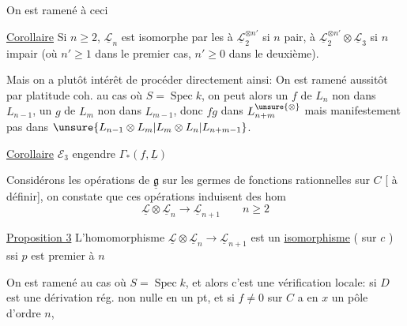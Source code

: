 On est ramené à ceci

\uline{Corollaire} Si $n\geq2$, $\underline{\mathcal L}_n$ est isomorphe par les  à $\underline{\mathcal L}_2^{\otimes n'}$ si $n$ pair, à $\underline{\mathcal L}_2^{\otimes n'}\otimes\underline{\mathcal L}_3$ si $n$ impair (où $n'\geq1$ dans le premier cas, $n'\geq0$ dans le deuxième).

Mais on a plutôt intérêt de procéder directement ainsi: On est ramené aussitôt par platitude coh. au cas où $S=\operatorname{Spec} k$, on peut alors un  $f$ de $L_n$ non dans $L_{n-1}$, un $g$ de $L_m$ non dans $L_{m-1}$, donc $fg$  dans $L_{n+m}^{\unsure{\otimes}}$ mais manifestement pas dans $\unsure{L_{n-1}\otimes L_m|L_m\otimes L_n|L_{n+m-1}}$.

\uline{Corollaire} $\mathcal E_3$ engendre $\Gamma_*(f,\underline L)$

Considérons les opérations de $\underline{\mathfrak g}$ sur les germes de fonctions rationnelles sur $C$ [ à définir], on constate que  ces opérations induisent des hom
\[
\underline{\mathcal L}\otimes\underline{\mathcal L}_n\longrightarrow\underline{\mathcal L}_{n+1}\qquad n\geq2
\]

\uline{Proposition 3}  L'homomorphisme $\underline{\mathcal L}\otimes\underline{\mathcal L}_n\longrightarrow\underline{\mathcal L}_{n+1}$ est un \uline{isomorphisme} (  sur $c$ ) ssi $p$ est premier à $n$

On est ramené au cas où $S=\operatorname{Spec} k$, et alors c'est une vérification locale: si $D$ est une  dérivation rég. non nulle en un pt, et si $f\ne0$ sur $C$ a en $x$ un pôle d'ordre $n$,
